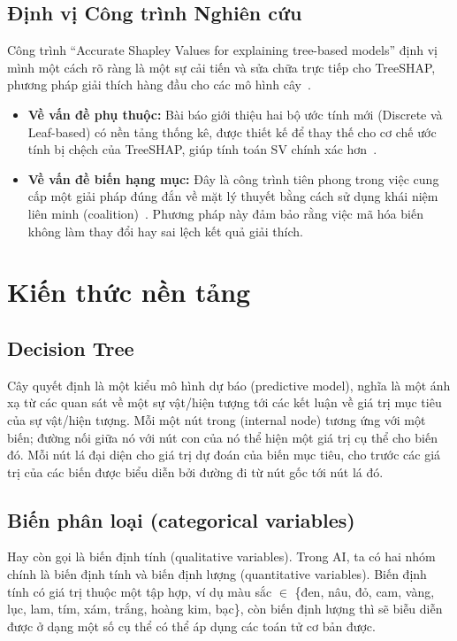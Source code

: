 \documentclass[12pt, a4paper]{article}
\begin{document}
\subsection{Định vị Công trình Nghiên cứu}

Công trình ``Accurate Shapley Values for explaining tree-based models'' định vị mình một cách rõ ràng là một sự cải tiến và sửa chữa trực tiếp cho TreeSHAP, phương pháp giải thích hàng đầu cho các mô hình cây~\citep{Lundberg2020, Lundberg2017}. 

\begin{itemize}
    \item \textbf{Về vấn đề phụ thuộc:} Bài báo giới thiệu hai bộ ước tính mới (Discrete và Leaf-based) có nền tảng thống kê, được thiết kế để thay thế cho cơ chế ước tính bị chệch của TreeSHAP, giúp tính toán SV chính xác hơn~\citep{Aas2020}.
    \item \textbf{Về vấn đề biến hạng mục:} Đây là công trình tiên phong trong việc cung cấp một giải pháp đúng đắn về mặt lý thuyết bằng cách sử dụng khái niệm liên minh (coalition)~\citep{Aas2020}. Phương pháp này đảm bảo rằng việc mã hóa biến không làm thay đổi hay sai lệch kết quả giải thích.
\end{itemize}


\section{Kiến thức nền tảng}
\subsection{Decision Tree}
Cây quyết định là một kiểu mô hình dự báo (predictive model), nghĩa là một ánh xạ từ các quan sát về một sự vật/hiện tượng tới các kết luận về giá trị mục tiêu của sự vật/hiện tượng. Mỗi một nút trong (internal node) tương ứng với một biến; đường nối giữa nó với nút con của nó thể hiện một giá trị cụ thể cho biến đó. Mỗi nút lá đại diện cho giá trị dự đoán của biến mục tiêu, cho trước các giá trị của các biến được biểu diễn bởi đường đi từ nút gốc tới nút lá đó.

\subsection{Biến phân loại (categorical variables)}
Hay còn gọi là biến định tính (qualitative variables). Trong AI, ta có hai nhóm chính là biến định tính và biến định lượng (quantitative variables). Biến định tính có giá trị thuộc một tập hợp, ví dụ màu sắc $\in$ \{đen, nâu, đỏ, cam, vàng, lục, lam, tím, xám, trắng, hoàng kim, bạc\}, còn biến định lượng thì sẽ biễu diễn được ở dạng một số cụ thể có thể áp dụng các toán tử cơ bản được.
\end{document}

